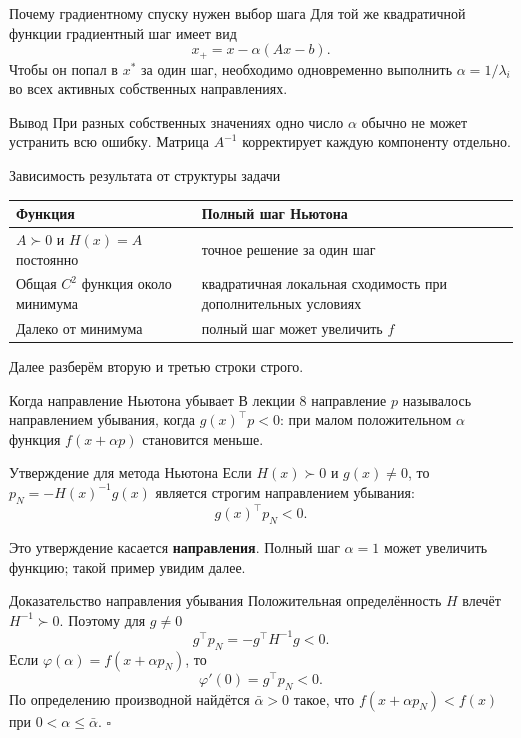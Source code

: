\documentclass[aspectratio=169,10pt]{beamer}
\begin{document}
\begin{frame}{Почему градиентному спуску нужен выбор шага}
\small
Для той же квадратичной функции градиентный шаг имеет вид
\[
x_+=x-\alpha(Ax-b).
\]
Чтобы он попал в $x^*$ за один шаг, необходимо одновременно выполнить $\alpha=1/\lambda_i$ во всех активных собственных направлениях.
\begin{block}{Вывод}
При разных собственных значениях одно число $\alpha$ обычно не может устранить всю ошибку. Матрица $A^{-1}$ корректирует каждую компоненту отдельно.
\end{block}
\end{frame}

\begin{frame}{Зависимость результата от структуры задачи}
\small
\begin{tabular}{@{}p{.30\linewidth}p{.59\linewidth}@{}}
\toprule
Функция & Полный шаг Ньютона\\
\midrule
$A\succ0$ и $H(x)=A$ постоянно & точное решение за один шаг\\
Общая $C^2$ функция около минимума & квадратичная локальная сходимость при дополнительных условиях\\
Далеко от минимума & полный шаг может увеличить $f$\\
\bottomrule
\end{tabular}

\par\vspace{.7em}
Далее разберём вторую и третью строки строго.
\end{frame}

\begin{frame}{Когда направление Ньютона убывает}
\small
В лекции 8 направление $p$ называлось направлением убывания, когда $g(x)^\top p<0$: при малом положительном $\alpha$ функция $f(x+\alpha p)$ становится меньше.
\begin{block}{Утверждение для метода Ньютона}
Если $H(x)\succ0$ и $g(x)\ne0$, то $p_N=-H(x)^{-1}g(x)$ является строгим направлением убывания:
\[
\boxed{g(x)^\top p_N<0.}
\]
\end{block}
Это утверждение касается \textbf{направления}. Полный шаг $\alpha=1$ может увеличить функцию; такой пример увидим далее.
\end{frame}

\begin{frame}{Доказательство направления убывания}
\small
Положительная определённость $H$ влечёт $H^{-1}\succ0$. Поэтому для $g\ne0$
\[
g^\top p_N=-g^\top H^{-1}g<0.
\]
Если $\varphi(\alpha)=f(x+\alpha p_N)$, то
\[
\varphi'(0)=g^\top p_N<0.
\]
По определению производной найдётся $\bar\alpha>0$ такое, что $f(x+\alpha p_N)<f(x)$ при $0<\alpha\le\bar\alpha$. $\square$
\end{frame}
\end{document}
